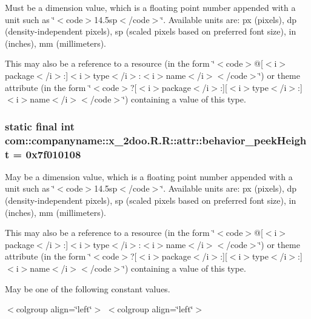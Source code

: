 Must be a dimension value, which is a floating point number appended with a unit such as \char`\"{}$<$code$>$14.5sp$<$/code$>$\char`\"{}. Available units are: px (pixels), dp (density-independent pixels), sp (scaled pixels based on preferred font size), in (inches), mm (millimeters). 

This may also be a reference to a resource (in the form \char`\"{}$<$code$>$@\mbox{[}$<$i$>$package$<$/i$>$:\mbox{]}$<$i$>$type$<$/i$>$:$<$i$>$name$<$/i$>$$<$/code$>$\char`\"{}) or theme attribute (in the form \char`\"{}$<$code$>$?\mbox{[}$<$i$>$package$<$/i$>$:\mbox{]}\mbox{[}$<$i$>$type$<$/i$>$:\mbox{]}$<$i$>$name$<$/i$>$$<$/code$>$\char`\"{}) containing a value of this type. \hypertarget{classcom_1_1companyname_1_1x__2doo_1_1_r_1_1attr_71135c79275013f7c8e4eb0d1639031a}{
\subsubsection[{behavior\_\-peekHeight}]{\setlength{\rightskip}{0pt plus 5cm}static final int com::companyname::x\_\-2doo.R.R::attr::behavior\_\-peekHeight = 0x7f010108}}
\label{classcom_1_1companyname_1_1x__2doo_1_1_r_1_1attr_71135c79275013f7c8e4eb0d1639031a}


May be a dimension value, which is a floating point number appended with a unit such as \char`\"{}$<$code$>$14.5sp$<$/code$>$\char`\"{}. Available units are: px (pixels), dp (density-independent pixels), sp (scaled pixels based on preferred font size), in (inches), mm (millimeters). 

This may also be a reference to a resource (in the form \char`\"{}$<$code$>$@\mbox{[}$<$i$>$package$<$/i$>$:\mbox{]}$<$i$>$type$<$/i$>$:$<$i$>$name$<$/i$>$$<$/code$>$\char`\"{}) or theme attribute (in the form \char`\"{}$<$code$>$?\mbox{[}$<$i$>$package$<$/i$>$:\mbox{]}\mbox{[}$<$i$>$type$<$/i$>$:\mbox{]}$<$i$>$name$<$/i$>$$<$/code$>$\char`\"{}) containing a value of this type. 

May be one of the following constant values. \begin{TabularC}{0}
\hline
\end{TabularC}
$<$colgroup align=\char`\"{}left\char`\"{}$>$ $<$colgroup align=\char`\"{}left\char`\"{}$>$ 

